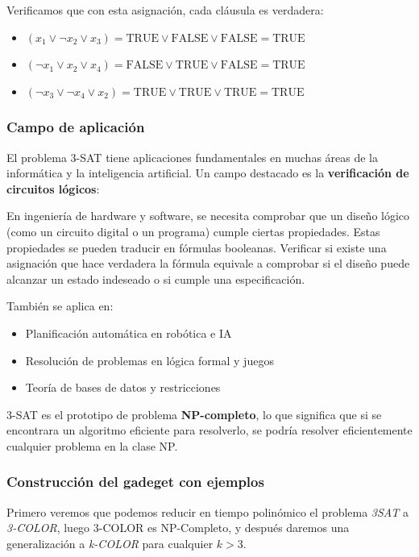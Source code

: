 \documentclass[a4paper,12pt]{article}
\begin{document}
Verificamos que con esta asignación, cada cláusula es verdadera:
\begin{itemize}
  \item $(x_1 \lor \neg x_2 \lor x_3) = \text{TRUE} \lor \text{FALSE} \lor \text{FALSE} = \text{TRUE}$
  \item $(\neg x_1 \lor x_2 \lor x_4) = \text{FALSE} \lor \text{TRUE} \lor \text{FALSE} = \text{TRUE}$
  \item $(\neg x_3 \lor \neg x_4 \lor x_2) = \text{TRUE} \lor \text{TRUE} \lor \text{TRUE} = \text{TRUE}$
\end{itemize}

\subsubsection{Campo de aplicación}

El problema 3-SAT tiene aplicaciones fundamentales en muchas áreas de la informática y la inteligencia artificial. Un campo destacado es la \textbf{verificación de circuitos lógicos}:

En ingeniería de hardware y software, se necesita comprobar que un diseño lógico (como un circuito digital o un programa) cumple ciertas propiedades. Estas propiedades se pueden traducir en fórmulas booleanas. Verificar si existe una asignación que hace verdadera la fórmula equivale a comprobar si el diseño puede alcanzar un estado indeseado o si cumple una especificación.

También se aplica en:
\begin{itemize}
  \item Planificación automática en robótica e IA
  \item Resolución de problemas en lógica formal y juegos
  \item Teoría de bases de datos y restricciones
\end{itemize}

3-SAT es el prototipo de problema \textbf{NP-completo}, lo que significa que si se encontrara un algoritmo eficiente para resolverlo, se podría resolver eficientemente cualquier problema en la clase NP.



\subsubsection{ Construcción del gadeget con ejemplos}

Primero veremos que podemos reducir en tiempo polinómico el problema \textit{3SAT} a \textit{3-COLOR}, luego 3-COLOR es NP-Completo, y después daremos una generalización a \textit{k-COLOR} para cualquier $k > 3$.
\end{document}
